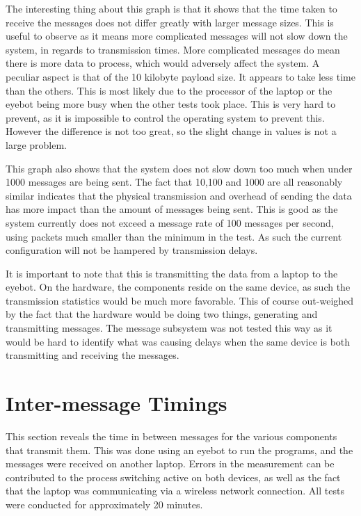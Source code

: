 The interesting thing about this graph is that it shows that the time taken to receive the messages does not differ greatly with larger message sizes. This is useful to observe as it means more complicated messages will not slow down the system, in regards to transmission times. More complicated messages do mean there is more data to process, which would adversely affect the system. A peculiar aspect is that of the 10 kilobyte payload size. It appears to take less time than the others. This is most likely due to the processor of the laptop or the eyebot being more busy when the other tests took place. This is very hard to prevent, as it is impossible to control the operating system to prevent this. However the difference is not too great, so the slight change in values is not a large problem.

This graph also shows that the system does not slow down too much when under 1000 messages are being sent. The fact that 10,100 and 1000 are all reasonably similar indicates that the physical transmission and overhead of sending the data has more impact than the amount of messages being sent. This is good as the system currently does not exceed a message rate of 100 messages per second, using packets much smaller than the minimum in the test. As such the current configuration will not be hampered by transmission delays.

It is important to note that this is transmitting the data from a laptop to the eyebot. On the hardware, the components reside on the same device, as such the transmission statistics would be much more favorable. This of course out-weighed by the fact that the hardware would be doing two things, generating and transmitting messages. The message subsystem was not tested this way as it would be hard to identify what was causing delays when the same device is both transmitting and receiving the messages.


\section{Inter-message Timings}

This section reveals the time in between messages for the various components that transmit them. This was done using an eyebot to run the programs, and the messages were received on another laptop. Errors in the measurement can be contributed to the process switching active on both devices, as well as the fact that the laptop was communicating via a wireless network connection. All tests were conducted for approximately 20 minutes.

